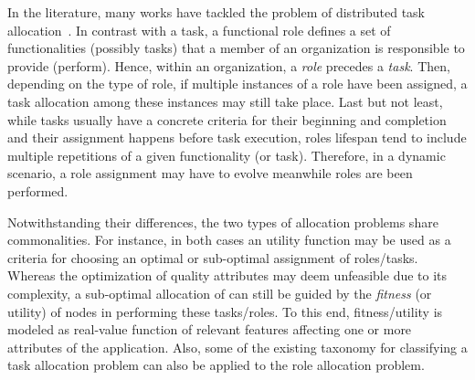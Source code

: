 In the literature, many works have tackled the problem of distributed task allocation~\cite{DTA}. In contrast with a task, a functional role defines a set of functionalities (possibly tasks) that a member of an organization is responsible to provide (perform). Hence, within an organization, a \textit{role} precedes a \textit{task}. Then, depending on the type of role, if multiple instances of a role have been assigned, a task allocation among these instances may still take place. Last but not least, while tasks usually have a concrete criteria for their beginning and completion and their assignment happens before task execution, roles lifespan tend to include multiple repetitions of a given functionality (or task). Therefore, in a dynamic scenario, a role assignment may have to evolve meanwhile roles are been performed.

Notwithstanding their differences, the two types of allocation problems share commonalities. For instance, in both cases an utility function may be used as a criteria for choosing an optimal or sub-optimal assignment of roles/tasks. Whereas the optimization of quality attributes may deem unfeasible due to its complexity, a sub-optimal allocation of can still be guided by the \textit{fitness} (or utility) of nodes in performing these tasks/roles. To this end, fitness/utility is modeled as real-value function of relevant features affecting one or more attributes of the application. Also, some of the existing taxonomy for classifying a task allocation problem can also be applied to the role allocation problem.

